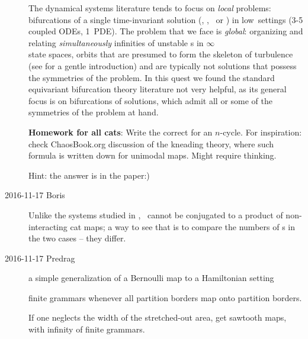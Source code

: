 \begin{description}
The dynamical systems literature tends to focus on \emph{local} problems:
bifurcations of a single time-invariant solution (\eqv, \reqv, \po\ or
\rpo) in low\dmn\ settings (3-5 coupled ODEs, 1\dmn\ PDE).
The problem that we face is \emph{global}: organizing and relating
\emph{simultaneously} infinities of unstable \rpo s in
$\infty$\dmn\\ state spaces, orbits that are presumed to form the
skeleton of turbulence (see  for a gentle
introduction) and are typically not solutions that possess the symmetries
of the problem. In this quest we found the standard equivariant
bifurcation theory literature not very helpful, as its general focus is
on bifurcations of solutions, which admit all or some of the symmetries
of the problem at hand.

     {
{\bf Homework for all cats}:
Write the correct  for an $n$-cycle. For inspiration:
check ChaosBook.org discussion of the kneading theory, where such formula is
written down for unimodal maps. Might require thinking.

Hint: the answer is in the paper:)
    }

\item[2016-11-17 Boris]
Unlike the systems studied in , \catlatt\ cannot be
conjugated to a product of non-interacting  cat maps; a way to see that is to
compare the numbers of \po s in the two cases -- they differ.

\item[2016-11-17 Predrag] a simple generalization of a Bernoulli map  to a
    Hamiltonian setting

finite grammars whenever all partition borders map onto partition borders.

If one neglects the width of the stretched-out area, get sawtooth maps, with
infinity of finite grammars.

\bigskip\bigskip


\end{description}
